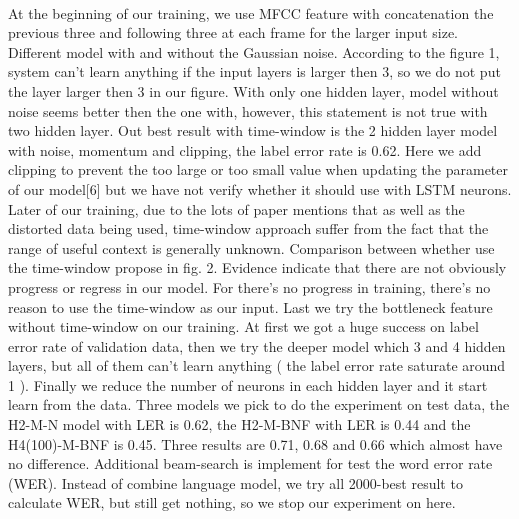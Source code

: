 \documentclass[conference]{IEEEtran}
\begin{document}
\\
At the beginning of our training, we use MFCC feature with concatenation the previous three and following three at each frame for the larger input size.  Different model with and without the Gaussian noise.  According to the figure 1, system can't learn anything if the input layers is larger then 3, so we do not put the layer larger then 3 in our figure.  With only one hidden layer, model without noise seems better then the one with, however, this statement is not true with two hidden layer.  Out best result with time-window is the 2 hidden layer model with noise, momentum and clipping, the label error rate is 0.62.  Here we add clipping to prevent the too large or too small value when updating the parameter of our model[6] but we have not verify whether it should use with LSTM neurons.  \\
Later of our training, due to the lots of paper mentions that as well as the distorted data being used, time-window  approach suffer from the fact that the range of useful context is generally unknown.  Comparison between whether use the time-window propose in fig. 2.  Evidence indicate that there are not obviously progress or regress in our model.  For there's no progress in training, there's no reason to use the time-window as our input.  Last we try the bottleneck feature without time-window on our training.  At first we got a huge success on label error rate of validation data, then we try the deeper model which 3 and 4 hidden layers, but all of them can't learn anything ( the label error rate saturate around 1 ).  Finally we reduce the number of neurons in each hidden layer and it start learn from the data.  Three models we pick to do the experiment on test data, the H2-M-N model with LER is 0.62, the H2-M-BNF with LER is 0.44 and the H4(100)-M-BNF is  0.45.  Three results are 0.71, 0.68 and 0.66 which almost have no difference.  Additional beam-search is implement for test the word error rate (WER). Instead of combine language model, we try all 2000-best result to calculate WER, but still get nothing, so we stop our experiment on here.
\end{document}

